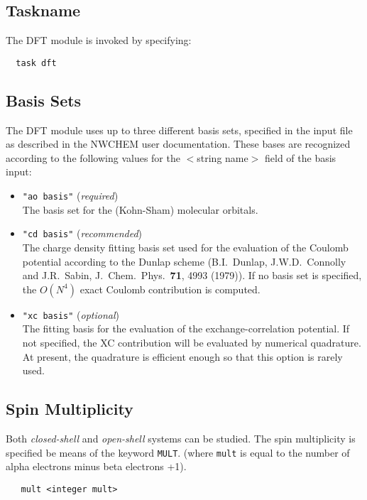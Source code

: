 \subsection{Taskname}
The DFT module is invoked by specifying:
\begin{verbatim}
  task dft
\end{verbatim}

\subsection{Basis Sets}
The DFT module uses up to three different basis sets, specified 
in the input file as described in the NWCHEM user documentation.
These bases are recognized according to
the following values for the $<$string name$>$ field of the basis input:
\begin{itemize}
\item {\tt "ao basis"}  ({\sl required}) \\
   The basis set for the (Kohn-Sham) molecular orbitals.
\item {\tt "cd basis"} ({\sl recommended}) \\
   The charge density fitting basis set used for the
  evaluation of the Coulomb potential according to the Dunlap scheme
  (B.I.~Dunlap, J.W.D.~Connolly and J.R.~Sabin, J.~Chem.~Phys.~{\bf 71},
  4993 (1979)).  If no basis set is specified,
  the $O(N^4)$ exact Coulomb contribution is computed. 
\item {\tt "xc basis"}  ({\sl optional})\\
   The fitting basis for the evaluation of the
  exchange-correlation potential.  If not specified,
  the XC contribution will be evaluated by numerical quadrature.
  At present, the quadrature is efficient enough so that this option
  is rarely used.
\end{itemize}

\subsection{Spin Multiplicity}

Both {\sl closed-shell} and {\sl open-shell} systems can be studied. 
The spin multiplicity is specified be means of the keyword {\tt MULT}.
(where \verb+mult+ is equal to the number of alpha electrons minus
beta electrons +1).

\begin{verbatim}
   mult <integer mult> 
\end{verbatim}

